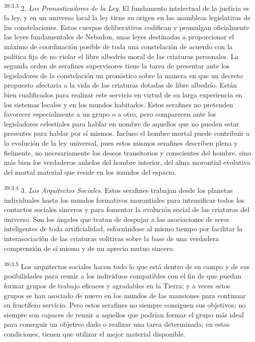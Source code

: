\par
\textsuperscript{39:3.3} 2. \textit{Los Pronosticadores de la Ley}. El fundamento intelectual de la justicia es la ley, y en un universo local la ley tiene su origen en las asambleas legislativas de las constelaciones. Estos cuerpos deliberativos codifican y promulgan oficialmente las leyes fundamentales de Nebadon, unas leyes destinadas a proporcionar el máximo de coordinación posible de toda una constelación de acuerdo con la política fija de no violar el libre albedrío moral de las criaturas personales. La segunda orden de serafines supervisores tiene la tarea de presentar ante los legisladores de la constelación un pronóstico sobre la manera en que un decreto propuesto afectaría a la vida de las criaturas dotadas de libre albedrío. Están bien cualificados para realizar este servicio en virtud de su larga experiencia en los sistemas locales y en los mundos habitados. Estos serafines no pretenden favorecer especialmente a un grupo o a otro, pero comparecen ante los legisladores celestiales para hablar en nombre de aquellos que no pueden estar presentes para hablar por sí mismos. Incluso el hombre mortal puede contribuir a la evolución de la ley universal, pues estos mismos serafines describen plena y fielmente, no necesariamente los deseos transitorios y conscientes del hombre, sino más bien los verdaderos anhelos del hombre interior, del alma morontial evolutiva del mortal material que reside en los mundos del espacio.

\par
\textsuperscript{39:3.4} 3. \textit{Los Arquitectos Sociales}. Estos serafines trabajan desde los planetas individuales hasta los mundos formativos morontiales para intensificar todos los contactos sociales sinceros y para fomentar la evolución social de las criaturas del universo. Son los ángeles que tratan de despojar a las asociaciones de seres inteligentes de toda artificialidad, esforzándose al mismo tiempo por facilitar la interasociación de las criaturas volitivas sobre la base de una verdadera comprensión de sí mismo y de un aprecio mutuo sincero.

\par
\textsuperscript{39:3.5} Los arquitectos sociales hacen todo lo que está dentro de su campo y de sus posibilidades para reunir a los individuos compatibles con el fin de que puedan formar grupos de trabajo eficaces y agradables en la Tierra; y a veces estos grupos se han asociado de nuevo en los mundos de las mansiones para continuar su fructífero servicio. Pero estos serafines no siempre consiguen sus objetivos; no siempre son capaces de reunir a aquellos que podrían formar el grupo más ideal para conseguir un objetivo dado o realizar una tarea determinada; en estas condiciones, tienen que utilizar el mejor material disponible.

